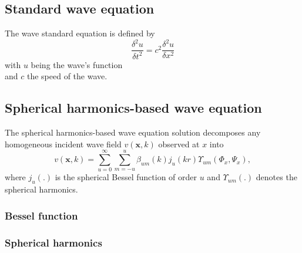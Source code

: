 \subsection{Standard wave equation}
The wave standard equation is defined by
\begin{equation}
    \frac{\delta ^2 u}{\delta t^2} = c^2 \frac{\delta ^2 u}{\delta x^2}
\end{equation}
with $u$ being the wave's function\\
and $c$ the speed of the wave.
\subsection{Spherical harmonics-based wave equation}
The spherical harmonics-based wave equation solution decomposes any homogeneous incident wave field $v(\textbf{x},k)$ observed at $x$ into
\begin{equation}
    v(\textbf{x},k) = \sum_{u=0}^\infty \sum_{m=-u}^u\beta_{um}(k)j_u(kr)\Upsilon_{um}(\Phi_x,\Psi_x),
\end{equation}
where $j_u(.)$ is the spherical Bessel function of order $u$ and $\Upsilon_{um}(.)$ denotes the spherical harmonics.\cite{Zhang2019}
\subsubsection{Bessel function}

\subsubsection{Spherical harmonics}